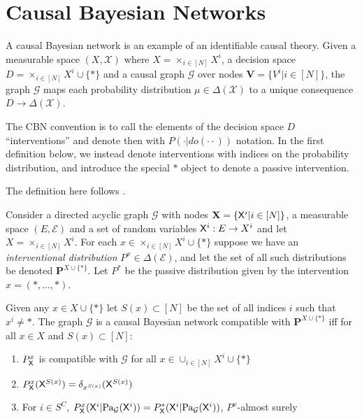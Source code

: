 \section{Causal Bayesian Networks}

A causal Bayesian network is an example of an identifiable causal theory. Given a measurable space $(X,\mathcal{X})$ where $X=\times_{i\in [N]} X^i$, a decision space $D = \times_{i\in [N]} X^i\cup\{*\}$ and a causal graph $\mathcal{G}$ over nodes $\mathbf{V}=\{V^i|i\in [N]\}$, the graph $\mathcal{G}$ maps each probability distribution $\mu\in \Delta(\mathcal{X})$ to a unique consequence $D\to \Delta(\mathcal{X})$.

The CBN convention is to call the elements of the decision space $D$ ``interventions'' and denote then with $P(\cdot|do(\cdot\cdot))$ notation. In the first definition below, we instead denote interventions with indices on the probability distribution, and introduce the special $*$ object to denote a passive intervention.

\begin{definition}\label{def:CBN}
The definition here follows \cite{pearl_causality:_2009}.

Consider a directed acyclic graph $\mathcal{G}$ with nodes $\mathbf{X}=\{\mathsf{X}^i|i\in [N]\}$, a measurable space $(E,\mathcal{E})$ and a set of random variables $\mathsf{X}^i:E\to X^i$ and let $X=\times_{i\in[N]} X^i$. For each $x\in \times_{i\in [N]} X^i\cup \{*\}$ suppose we have an \emph{interventional distribution} $P^{x}\in \Delta(\mathcal{E})$, and let the set of all such distributions be denoted $\mathbf{P}^{X\cup\{*\}}$. Let $P^*$ be the passive distribution given by the intervention $x = (*,...,*)$.

Given any $x\in X\cup\{*\}$ let $S(x)\subset[N]$ be the set of all indices $i$ such that $x^i\neq *$. The graph $\mathcal{G}$ is a causal Bayesian network compatible with $\mathbf{P}^{X\cup\{*\}}$ iff for all $x\in X$ and $S(x)\subset [N]$:
\begin{enumerate}
    \item $P^{x}_{\mathsf{X}}$ is compatible with $\mathcal{G}$ for all $x\in \cup_{i\in [N]} X^i\cup \{*\}$
    \item $P^x_{\mathsf{X}}(\mathsf{X}^{S(x)})=\delta_{x^{S(x)}}(\mathsf{X}^{S(x)})$
    \item For $i\in S^C$, $P^x_{\mathsf{X}}(\mathsf{X}^i|\text{Pa}_{\mathcal{G}}(\mathsf{X}^i))=P^*_{\mathsf{X}}(\mathsf{X}^i|\text{Pa}_{\mathcal{G}}(\mathsf{X}^i))$, $P^x$-almost surely
\end{enumerate}
\end{definition}

